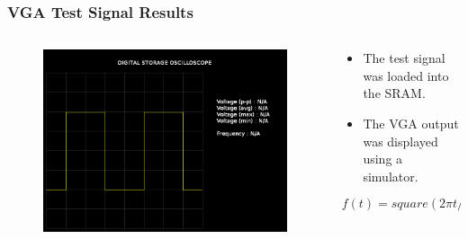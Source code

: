 \documentclass{beamer}
\begin{document}
\begin{frame}
\frametitle{VGA Test Signal Results}

\begin{columns}[onlytextwidth]
  \begin{column}{0.5\linewidth}
  
  	\begin{figure}[!htb]
      \includegraphics[width=\linewidth]{vga_test_signal2_results.png}
	\end{figure}
    
  \end{column}
  \begin{column}{0.45\linewidth}
  
  	\begin{itemize}
      \item The test signal was loaded into the SRAM.
      \item The VGA output was displayed using a simulator.
	\end{itemize}
    
  	\[ f(t) = square(2 \pi t / T) \]
    
  \end{column}
\end{columns}

\end{frame}
\end{document}
